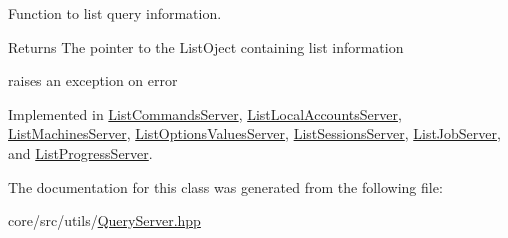 Function to list query information. 

\begin{DoxyReturn}{Returns}
The pointer to the ListOject containing list information 

raises an exception on error 
\end{DoxyReturn}


Implemented in \hyperlink{classListCommandsServer_ae256dad4b7cb57e73dd3dc2c5dcb3e7b}{ListCommandsServer}, \hyperlink{classListLocalAccountsServer_aab1471d2b577b25471f12652b6e78b31}{ListLocalAccountsServer}, \hyperlink{classListMachinesServer_abbaceb388d6ad47bc9e82a3f33e978a3}{ListMachinesServer}, \hyperlink{classListOptionsValuesServer_a193d667fd5fa247300cebd4af85785d6}{ListOptionsValuesServer}, \hyperlink{classListSessionsServer_a2ce41ba3a29999d9ef1799c990d29b29}{ListSessionsServer}, \hyperlink{classListJobServer_a88da8c8e36fce6142758dc5779e0adae}{ListJobServer}, and \hyperlink{classListProgressServer_a638132aca020d8168e5185df47e881f0}{ListProgressServer}.



The documentation for this class was generated from the following file:\begin{DoxyCompactItemize}
\item 
core/src/utils/\hyperlink{QueryServer_8hpp}{QueryServer.hpp}\end{DoxyCompactItemize}
